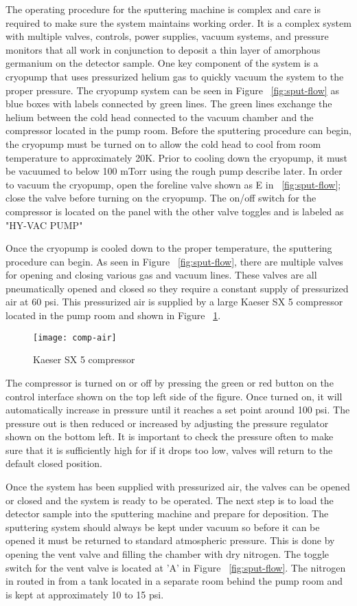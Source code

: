 The operating procedure for the sputtering machine is complex and care is required to make sure the system maintains working order.
It is a complex system with multiple valves, controls, power supplies, vacuum systems, and pressure monitors that all work in conjunction to deposit a thin layer of amorphous germanium on the detector sample.
One key component of the system is a cryopump that uses pressurized helium gas to quickly vacuum the system to the proper pressure.
The cryopump system can be seen in Figure ~\ref{fig:sput-flow} as blue boxes with labels connected by green lines.
The green lines exchange the helium between the cold head connected to the vacuum chamber and the compressor located in the pump room.
Before the sputtering procedure can begin, the cryopump must be turned on to allow the cold head to cool from room temperature to approximately 20K.
Prior to cooling down the cryopump, it must be vacuumed to below 100 mTorr using the rough pump describe later.
In order to vacuum the cryopump, open the foreline valve shown as E in ~\ref{fig:sput-flow}; close the valve before turning on the cryopump.
The on/off switch for the compressor is located on the panel with the other valve toggles and is labeled as "HY-VAC PUMP"

Once the cryopump is cooled down to the proper temperature, the sputtering procedure can begin.
As seen in Figure ~\ref{fig:sput-flow}, there are multiple valves for opening and closing various gas and vacuum lines.
These valves are all pneumatically opened and closed so they require a constant supply of pressurized air at 60 psi.
This pressurized air is supplied by a large Kaeser SX 5 compressor located in the pump room and shown in Figure ~\ref{fig:comp-air}.
\begin{figure}[htpb]
\centering
\texttt{[image: comp-air]}
\caption{Kaeser SX 5 compressor}
\label{fig:comp-air}
\end{figure}
The compressor is turned on or off by pressing the green or red button on the control interface shown on the top left side of the figure.
Once turned on, it will automatically increase in pressure until it reaches a set point around 100 psi.
The pressure out is then reduced or increased by adjusting the pressure regulator shown on the bottom left.
It is important to check the pressure often to make sure that it is sufficiently high for if it drops too low, valves will return to the default closed position.

Once the system has been supplied with pressurized air, the valves can be opened or closed and the system is ready to be operated.
The next step is to load the detector sample into the sputtering machine and prepare for deposition.
The sputtering system should always be kept under vacuum so before it can be opened it must be returned to standard atmospheric pressure.
This is done by opening the vent valve and filling the chamber with dry nitrogen.
The toggle switch for the vent valve is located at 'A' in Figure ~\ref{fig:sput-flow}.
The nitrogen in routed in from a tank located in a separate room behind the pump room and is kept at approximately 10 to 15 psi.

